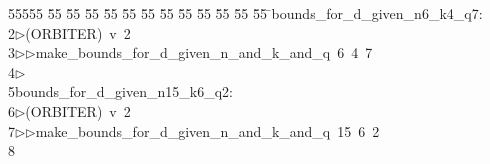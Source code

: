%
%
\begin{tabbing}
55555 \= 55 \= 55 \= 55 \= 55 \= 55 \= 55 \= 55 \= 55 \= 55 \= 55 \= 55 \= 55 \= \>bounds\_for\_d\_given\_n6\_k4\_q7:\\[0pt]
2\>$\triangleright$\>(ORBITER)\ v\ 2\ \\[0pt]
3\>$\triangleright$\>$\triangleright$\>make\_bounds\_for\_d\_given\_n\_and\_k\_and\_q\ 6\ 4\ 7\\[0pt]
4\>$\triangleright$\>\\[0pt]
5\>bounds\_for\_d\_given\_n15\_k6\_q2:\\[0pt]
6\>$\triangleright$\>(ORBITER)\ v\ 2\ \\[0pt]
7\>$\triangleright$\>$\triangleright$\>make\_bounds\_for\_d\_given\_n\_and\_k\_and\_q\ 15\ 6\ 2\\[0pt]
8\>\end{tabbing}
